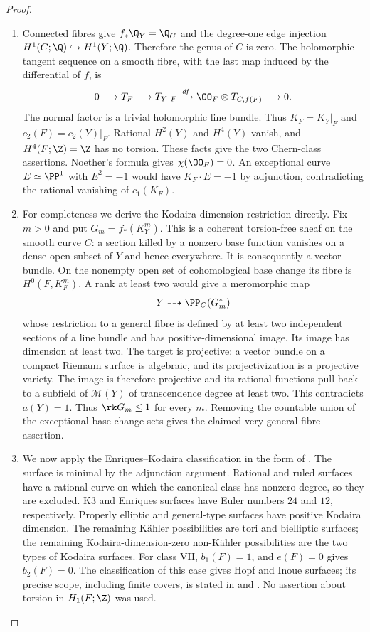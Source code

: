 \begin{proof}

\begin{enumerate}[label={$\langle1\rangle$\arabic*.},leftmargin=*]
\item Connected fibres give $f_*\Q_Y=\Q_C$ and the degree-one edge injection
$H^1(C;\Q)\hookrightarrow H^1(Y;\Q)$. Therefore the genus of $C$ is
zero. The holomorphic tangent sequence on a smooth fibre, with the
last map induced by the differential of $f$, is
\[
0\longrightarrow T_F\longrightarrow T_Y|_F
 \xrightarrow{df} \OO_F\otimes T_{C,f(F)}\longrightarrow0.
\]
The normal factor is a trivial holomorphic line bundle. Thus
$K_F=K_Y|_F$ and $c_2(F)=c_2(Y)|_F$. Rational $H^2(Y)$ and $H^4(Y)$
vanish, and $H^4(F;\Z)=\Z$ has no torsion. These facts give the two
Chern-class assertions. Noether's formula gives $\chi(\OO_F)=0$.
An exceptional curve $E\simeq\PP^1$ with $E^2=-1$ would have
$K_F\cdot E=-1$ by adjunction, contradicting the rational vanishing of
$c_1(K_F)$.

\item For completeness we derive the Kodaira-dimension restriction directly.
Fix $m>0$ and put $G_m=f_*(K_Y^m)$. This is a coherent torsion-free
sheaf on the smooth curve $C$: a section killed by a nonzero base
function vanishes on a dense open subset of $Y$ and hence everywhere.
It is consequently a vector bundle. On the nonempty open set of
cohomological base change its fibre is $H^0(F,K_F^m)$. A rank at least
two would give a meromorphic map
\[
 Y\dashrightarrow \PP_C(G_m^*)
\]
whose restriction to a general fibre is defined by at least two
independent sections of a line bundle and has positive-dimensional
image. Its image has dimension at least two. The target is projective:
a vector bundle on a compact Riemann surface is algebraic, and its
projectivization is a projective variety. The image is therefore
projective and its rational functions pull back to a subfield of
$\mathcal M(Y)$ of transcendence degree at least two. This contradicts
$a(Y)=1$. Thus $\rk G_m\leq1$ for every $m$. Removing the countable
union of the exceptional base-change sets gives the claimed very
general-fibre assertion.

\item We now apply the Enriques--Kodaira classification in the form of
\cite[Theorem 3.1]{Peters1990}. The surface is minimal by the
adjunction argument. Rational and ruled surfaces have a rational
curve on which the canonical class has nonzero degree, so they are
excluded. K3 and Enriques surfaces have Euler numbers $24$ and $12$,
respectively. Properly elliptic and general-type surfaces have
positive Kodaira dimension. The remaining K\"ahler possibilities are
tori and bielliptic surfaces; the remaining Kodaira-dimension-zero
non-K\"ahler possibilities are the two types of Kodaira surfaces.
For class VII, $b_1(F)=1$, and $e(F)=0$ gives $b_2(F)=0$. The
classification of this case gives Hopf and Inoue surfaces; its
precise scope, including finite covers, is stated in
\cite[p.~2]{Teleman2008} and \cite[Theorem 1]{BBK2019}.
No assertion about torsion in $H_1(F;\Z)$ was used.

\end{enumerate}
\end{proof}
